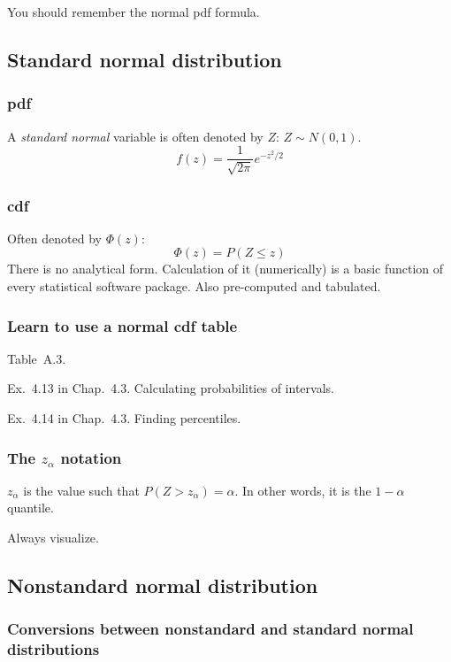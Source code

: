 \documentclass[12pt]{article}
\begin{document}
\alert You should remember the normal pdf formula.


\subsection{Standard normal distribution}

\subsubsection{pdf}
A \emph{standard normal} variable is often denoted by $Z$:
$Z \sim N(0, 1)$.
\[
f(z) = \frac{1}{\sqrt{2\pi}} e^{-z^2/2}
\]


\subsubsection{cdf}

Often denoted by $\Phi(z)$:
\[
\Phi(z) = P(Z \le z)
\]
There is no analytical form.
Calculation of it (numerically) is a basic function
of every statistical software package.
Also pre-computed and tabulated.

\subsubsection{Learn to use a normal cdf table}

Table~A.3.

\example
Ex.~4.13 in Chap.~4.3.
Calculating probabilities of intervals.


\example
Ex.~4.14 in Chap.~4.3.
Finding percentiles.


\subsubsection{The $z_\alpha$ notation}

$z_\alpha$ is the value such that
$P(Z > z_\alpha) = \alpha$.
In other words, it is the $1-\alpha$ quantile.


\alert Always visualize.

\subsection{Nonstandard normal distribution}

\subsubsection{Conversions between nonstandard and standard normal
distributions}
\end{document}
